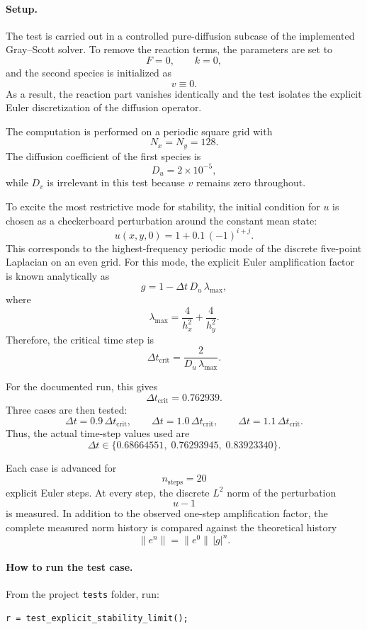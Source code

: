 \paragraph{Setup.}
The test is carried out in a controlled pure-diffusion subcase of the implemented Gray--Scott solver. To remove the reaction terms, the parameters are set to
\[
F = 0, \qquad k = 0,
\]
and the second species is initialized as
\[
v \equiv 0.
\]
As a result, the reaction part vanishes identically and the test isolates the explicit Euler discretization of the diffusion operator.

The computation is performed on a periodic square grid with
\[
N_x = N_y = 128.
\]
The diffusion coefficient of the first species is
\[
D_u = 2 \times 10^{-5},
\]
while \(D_v\) is irrelevant in this test because \(v\) remains zero throughout.

To excite the most restrictive mode for stability, the initial condition for \(u\) is chosen as a checkerboard perturbation around the constant mean state:
\[
u(x,y,0) = 1 + 0.1\,(-1)^{i+j}.
\]
This corresponds to the highest-frequency periodic mode of the discrete five-point Laplacian on an even grid. For this mode, the explicit Euler amplification factor is known analytically as
\[
g = 1 - \Delta t\,D_u\,\lambda_{\max},
\]
where
\[
\lambda_{\max} = \frac{4}{h_x^2} + \frac{4}{h_y^2}.
\]
Therefore, the critical time step is
\[
\Delta t_{\mathrm{crit}} = \frac{2}{D_u\,\lambda_{\max}}.
\]

For the documented run, this gives
\[
\Delta t_{\mathrm{crit}} = 0.762939.
\]
Three cases are then tested:
\[
\Delta t = 0.9\,\Delta t_{\mathrm{crit}}, \qquad
\Delta t = 1.0\,\Delta t_{\mathrm{crit}}, \qquad
\Delta t = 1.1\,\Delta t_{\mathrm{crit}}.
\]
Thus, the actual time-step values used are
\[
\Delta t \in \{0.68664551,\;0.76293945,\;0.83923340\}.
\]

Each case is advanced for
\[
n_{\text{steps}} = 20
\]
explicit Euler steps. At every step, the discrete \(L^2\) norm of the perturbation
\[
u - 1
\]
is measured. In addition to the observed one-step amplification factor, the complete measured norm history is compared against the theoretical history
\[
\|e^n\| = \|e^0\|\,|g|^n.
\]

\paragraph{How to run the test case.}
From the project \texttt{tests} folder, run:
\begin{verbatim}
r = test_explicit_stability_limit();
\end{verbatim}

